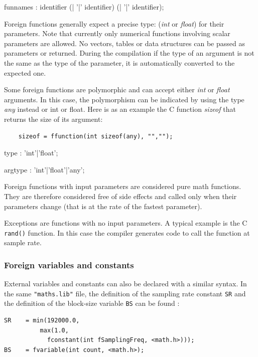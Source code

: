 \begin{rail}
funnames : identifier (| '|' identifier) (| '|' identifier);
\end{rail}

Foreign functions generally expect a precise type: (\textit{int} or \textit{float}) for their parameters. Note that currently only numerical functions involving scalar parameters are allowed. No vectors, tables or data structures can be passed as parameters or returned. During the compilation if the type of an argument is not the same as the type of the parameter, it is automatically converted to the expected one.

Some foreign functions are polymorphic and can accept either \textit{int} or \textit{float} arguments. In this case, the polymorphism can be indicated by using the type \textit{any} instead or int or float. Here is as an example the C function \textit{sizeof} that returns the size of its argument:

\begin{lstlisting}
	sizeof = ffunction(int sizeof(any), "","");
\end{lstlisting}

\begin{rail}
	type : 'int'|'float';
\end{rail}

\begin{rail}
	argtype : 'int'|'float'|'any';
\end{rail}

Foreign functions with input parameters are considered pure math functions. They are therefore considered free of side effects and called only when their parameters change (that is at the rate of the fastest parameter). 

Exceptions are functions with no input parameters. A typical example is the C \lstinline'rand()' function. In this case the compiler generates code to call the function at sample rate.

\subsubsection{Foreign variables and constants} 
External variables and constants can also be declared with a similar syntax. In the same \lstinline'"maths.lib"' file, the definition of the sampling rate constant \lstinline'SR' and the definition of the block-size variable \lstinline'BS' can be found :

\begin{lstlisting}
SR    = min(192000.0, 
	      max(1.0, 
	    	fconstant(int fSamplingFreq, <math.h>)));
BS    = fvariable(int count, <math.h>);
\end{lstlisting}

